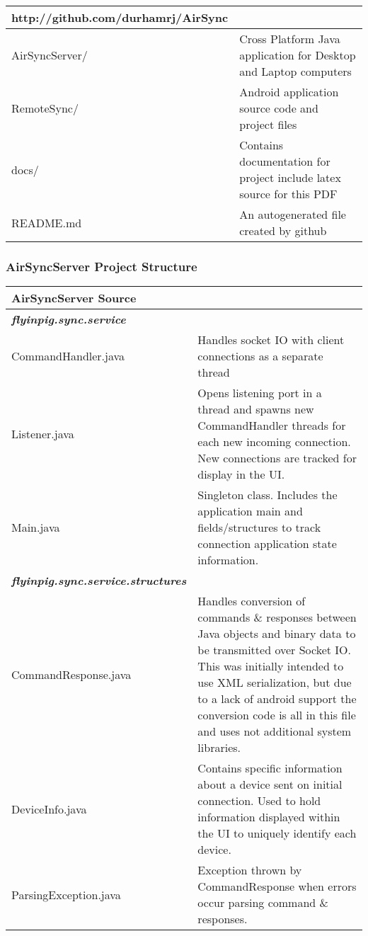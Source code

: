\documentclass[12pt,draft]{article}
\begin{document}
\begin{center}
\begin{tabular}{|l|p{7.5cm}|}
\hline
	\textbf{http://github.com/durhamrj/AirSync} \\
\hline
	AirSyncServer/ 
	& Cross Platform Java application for Desktop and Laptop computers\\
\hline 
	RemoteSync/
	& Android application source code and project files\\
\hline
	docs/
	& Contains documentation for project include latex source for this PDF\\
\hline
	README.md
	& An autogenerated file created by github\\
\hline
\end{tabular}
\end{center}

\subsubsection{AirSyncServer Project Structure}
\begin{center}
\begin{tabular}{|l|p{7.5cm}|}
\hline
	\textbf{AirSyncServer Source} \\
\hline
	\emph{\textbf{flyinpig.sync.service}}\\
\hline 
	CommandHandler.java
	& Handles socket IO with client connections as a separate thread\\
\hline
	Listener.java
	& Opens listening port in a thread and spawns new CommandHandler threads for each new incoming connection. New connections are tracked for display in the UI.\\
\hline
	Main.java
	& Singleton class. Includes the application main and fields/structures to track connection application state information.\\
\hline
	\emph{\textbf{flyinpig.sync.service.structures}}\\
\hline
	CommandResponse.java
	& Handles conversion of commands \& responses between Java objects and binary data to be transmitted over Socket IO. This was initially intended to use XML serialization, but due to a lack of android support the conversion code is all in this file and uses not additional system libraries.\\
\hline
	DeviceInfo.java
	& Contains specific information about a device sent on initial connection. Used to hold information displayed within the UI to uniquely identify each device.\\
\hline
	ParsingException.java
	& Exception thrown by CommandResponse when errors occur parsing command \& responses.\\
\hline
\end{tabular}
\end{center}
\end{document}
